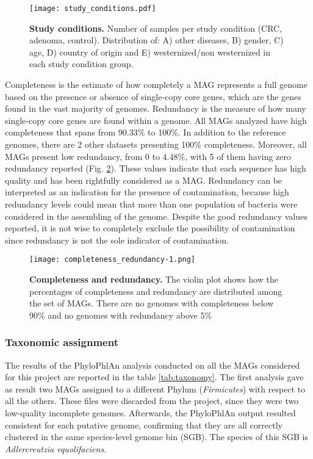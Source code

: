 \begin{figure}[!h]
    \centering
    \texttt{[image: study\_conditions.pdf]}
    \caption{\footnotesize{\textbf{Study conditions.} Number of samples per study condition (CRC, adenoma, control). Distribution of: A) other diseases, B) gender, C) age, D) country of origin and E) westernized/non westernized in each study condition group.}}
    \label{fig:studyConditions}
\end{figure}

Completeness is the estimate of how completely a MAG represents a full genome based on the presence or absence of single-copy core genes, which are the genes found in the vast majority of genomes. Redundancy is the measure of how many single-copy core genes are found within a genome\cite{anvio}. All MAGs analyzed have high completeness that spans from 90.33\% to 100\%. In addition to the reference genomes, there are 2 other datasets presenting 100\% completeness. Moreover, all MAGs present low redundancy, from 0 to 4.48\%, with 5 of them having zero redundancy reported (Fig. \ref{fig:completeness}). These values indicate that each sequence has high quality and has been rightfully considered as a MAG. Redundancy can be interpreted as an indication for the presence of contamination, because high redundancy levels could mean that more than one population of bacteria were considered in the assembling of the genome. Despite the good redundancy values reported, it is not wise to completely exclude the possibility of contamination since redundancy is not the sole indicator of contamination.

\begin{figure}[!h]
    \centering
    \texttt{[image: completeness\_redundancy-1.png]}
    \caption{\footnotesize{\textbf{Completeness and redundancy.} The violin plot shows how the percentages of completeness and redundancy are distributed among the set of MAGs. There are no genomes with completeness below 90\% and no genomes with redundancy above 5\%}}
    \label{fig:completeness}
\end{figure}

\subsubsection*{Taxonomic assignment}

The results of the PhyloPhlAn analysis conducted on all the MAGs considered for this project are reported in the table \ref{tab:taxonomy}. The first analysis gave as result two MAGs assigned to a different Phylum (\textit{Firmicutes}) with respect to all the others. These files were discarded from the project, since they were two low-quality incomplete genomes. Afterwards, the PhyloPhlAn output resulted consistent for each putative genome, confirming that they are all correctly clustered in the same species-level genome bin (SGB). The species of this SGB is \textit{Adlercreutzia equolifaciens}.\\

